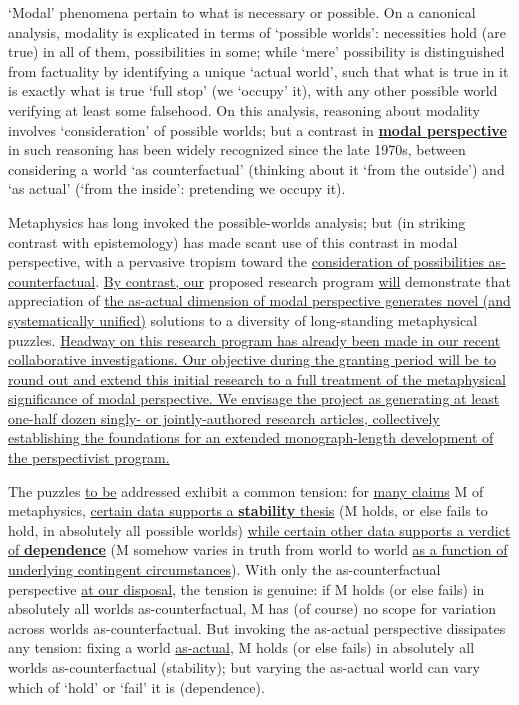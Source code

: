 \documentclass[12pt]{article}
\begin{document}
‘Modal’ phenomena pertain to what is necessary or possible.  On a canonical
analysis, modality is explicated in terms of ‘possible worlds’: necessities
hold (are true) in all of them, possibilities in some; while ‘mere’
possibility is distinguished from factuality by identifying a unique ‘actual
world’, such that what is true in it is exactly what is true ‘full stop’ (we
‘occupy’ it), with any other possible world verifying at least some falsehood.
On this analysis, reasoning about modality involves ‘consideration’ of
possible worlds; but a contrast in \ul{\textbf{modal perspective}} in such
reasoning has been widely recognized since the late 1970s, between considering
a world ‘as counterfactual’ (thinking about it ‘from the outside’) and ‘as
actual’ (‘from the inside’: pretending we occupy it). 

Metaphysics has long invoked the possible-worlds analysis; but (in striking
contrast with epistemology) has made scant use of this contrast in modal
perspective, with a pervasive tropism toward the \ul{consideration of
possibilities as-counterfactual}.  \ul{By contrast, our} proposed research
program \ul{will} demonstrate that appreciation of \ul{the as-actual dimension
of modal perspective generates novel (and systematically unified)} solutions
to a diversity of long-standing metaphysical puzzles. \ul{Headway on this
research program has already been made in our recent collaborative
investigations. Our objective during the granting period will be to round out
and extend this initial research to a full treatment of the metaphysical
significance of modal perspective. We envisage the project as generating at
least one-half dozen singly- or jointly-authored research articles,
collectively establishing the foundations for an extended monograph-length
development of the perspectivist program.} 

The puzzles \ul{to be} addressed exhibit a common tension: for \ul{many claims} M of
metaphysics, \ul{certain data supports a \textbf{stability} thesis} (M holds, or
else fails to hold, in absolutely all possible worlds) \ul{while certain other
data supports a verdict of \textbf{dependence}} (M somehow varies in truth from
world to world \ul{as a function of underlying contingent circumstances}).
With only the as-counterfactual perspective \ul{at our disposal}, the tension
is genuine: if M holds (or else fails) in absolutely all worlds
as-counterfactual, M has (of course) no scope for variation across worlds
as-counterfactual. But invoking the as-actual perspective dissipates any
tension: fixing a world \ul{as-actual}, M holds (or else fails) in absolutely
all worlds as-counterfactual (stability); but varying the as-actual world can
vary which of `hold' or `fail' it is (dependence).
\end{document}
